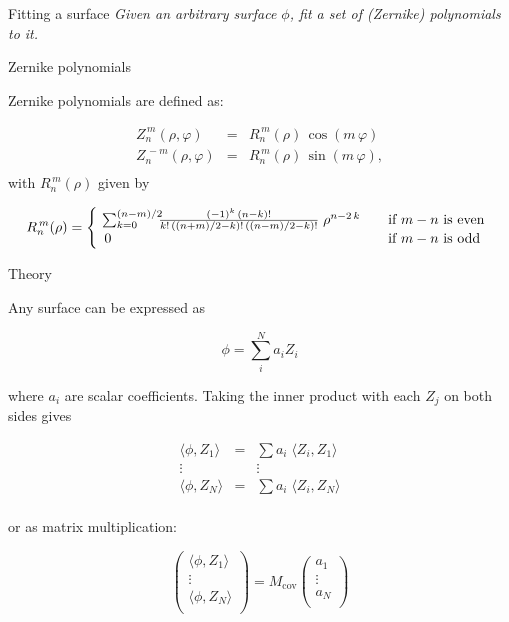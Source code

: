 \documentclass[xetex,10pt]{beamer}
\def\spacer{\vspace*{1em}}
\begin{document}
\begin{frame}[fragile]{Fitting a surface}
	\vfill
	\emph{Given an arbitrary surface $\phi$, fit a set of (Zernike) polynomials to it.}
	\vfill
\end{frame}

\begin{frame}[fragile]{Zernike polynomials}
	
	Zernike polynomials are defined as:
	
	\[
	\begin{array}{lcl}
	Z^{\,m}_n(\rho,\varphi) &=& R^{\,m}_{n}(\rho)\,\cos(m\,\varphi) \! \\
	Z^{\,-\!m}_n(\rho,\varphi) &=& R^{\,m}_{n}(\rho)\,\sin(m\,\varphi), \! \\
  	\end{array}
	\]
	\pause 
	with $R^{\,m}_{n}(\rho)$ given by
	
	\[
	R^{\,m}_{n}(\rho) = \left\{
	\begin{array}{l l}
    \! \sum_{k=0}^{(n-m)/2} \!\!\! \frac{(-1)^k\,(n-k)!}{k!\,((n+m)/2-k)!\,((n-m)/2-k)!} \;\rho^{n-2\,k} & \quad \text{if $m-n$ is even}\\
    0 & \quad \text{if $m-n$ is odd}\\
  	\end{array} \right.
	\]
	\spacer

\end{frame}

\begin{frame}[fragile]{Theory}
	
	Any surface can be expressed as 
	
	\[
	\phi = \sum_i^N a_i Z_i
	\]
	
	where $a_i$ are scalar coefficients. \pause Taking the inner product with each $Z_j$ on both sides gives
	
	\[
	\begin{array}{ccc}
	\langle \phi,Z_1 \rangle &=& \sum a_i \; \langle Z_i, Z_1 \rangle\\
	\vdots &  & \vdots \\
	\langle \phi,Z_N \rangle &=& \sum a_i \; \langle Z_i, Z_N \rangle\\
  	\end{array}
	\]
	
	\pause
	or as matrix multiplication:
	
	\[
	 \begin{pmatrix}
	 \langle \phi,Z_1 \rangle \\
	 \vdots \\
	 \langle \phi,Z_N \rangle \\
	 \end{pmatrix}
	 = M_{\mathrm{cov}} 
	 \begin{pmatrix}
	 a_1 \\
	 \vdots \\
	 a_N \\
	 \end{pmatrix}
	\]

\end{frame}
\end{document}
